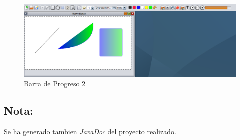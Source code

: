 \begin{figure}[H]
  \centering
    \includegraphics[scale=0.45]{images/barraprogreso}
  \caption{Barra de Progreso 2}
  \label{Barra de Progreso 2}
\end{figure}


\subsection*{Nota:}
Se ha generado tambien \emph{JavaDoc} del proyecto realizado.




